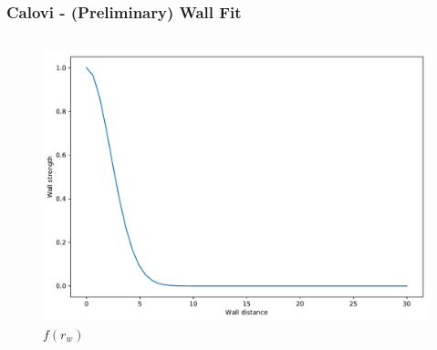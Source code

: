 \documentclass{beamer}
\begin{document}
\begin{frame}
  \frametitle{Calovi - (Preliminary) Wall Fit}
 \begin{columns}
   \begin{column}{0.5\textwidth}
     \begin{figure}[h]
       \centering
\includegraphics[clip, width=1\linewidth]{wall_force.pdf}
       \caption*{$f(r_w)$}
     \end{figure}
   \end{column}
   

\end{columns}
\end{frame}
\end{document}
